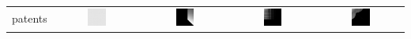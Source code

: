 \documentclass{article}
\begin{document}
\begin{table}[h]
\begin{tabular}{l | c c c c}
\hline
patents
&
    \includegraphics[width=0.23\textwidth]{../img/patents/adjacency-matrix-random-ordering.png}
& 
    \includegraphics[width=0.23\textwidth]{../img/patents/adjacency-matrix-given-ordering.png}
& 
    \includegraphics[width=0.23\textwidth]{../img/patents/adjacency-matrix-degree-ordering.png}
& 
    \includegraphics[width=0.23\textwidth]{../img/patents/adjacency-matrix-slashburn-ordering.png} \\


\end{tabular}
\end{table}
\end{document}
